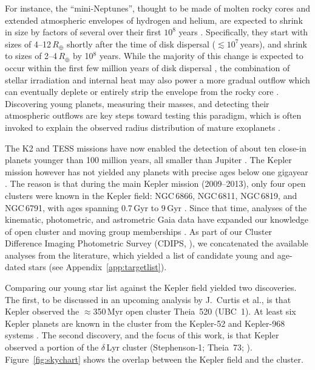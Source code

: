 \documentclass[12pt,modern,twocolumn,tighten]{aastex63}
\begin{document}
For instance, the ``mini-Neptunes'', thought to be made of molten
rocky cores \citep{kite_atmosphere_2020} and extended atmospheric
envelopes of hydrogen and helium, are expected to shrink in size by
factors of several over their first $10^8$ years
\citep{owen_atmospheres_2016,owen_constraining_2020}.  Specifically,
they start with sizes of 4--12\,$R_\oplus$ shortly after the time of disk
dispersal ($\lesssim$$10^7$\,years), and shrink to sizes of
2--4\,$R_\oplus$ by 10$^8$ years.  While the majority of this change
is expected to occur within the first few million years of disk
dispersal \citep{owen_atmospheres_2016}, the combination of stellar
irradiation and internal heat may also power a more
gradual outflow which can eventually deplete or entirely strip the
envelope from the rocky core
\citep{Owen_Wu_2013,ginzburg_corepowered_2018}.  Discovering young
planets, measuring their masses, and detecting their atmospheric
outflows are key steps toward testing this paradigm, which is often
invoked to explain the observed radius distribution of mature
exoplanets \citep{Fulton_et_al_2017}.

The K2 and TESS missions have now enabled the detection of about ten
close-in planets younger than 100 million years, all smaller than
Jupiter
\citep{Mann_K2_33b_2016,David_et_al_2017,david_four_2019,newton_tess_2019,bouma_cluster_2020,plavchan_planet_2020,rizzuto_tess_2020}.
The Kepler mission however has not yielded any planets with precise
ages below one gigayear \citep{Meibom_et_al_2013}.  The reason is that
during the main Kepler mission (2009--2013), only four open
clusters were known in the Kepler field: NGC\,6866, NGC\,6811,
NGC\,6819, and NGC\,6791, with ages spanning 0.7\,Gyr to 9\,Gyr
\citep{meibom_kepler_2011}.  Since that time, analyses of the
kinematic, photometric, and astrometric Gaia data have expanded our
knowledge of open cluster and moving group memberships \citep[{\it
e.g.},][]{cantatgaudin_gaia_2018,zari_3d_2018,kounkel_untangling_2019,Meingast2021,Kerr2021}.
As part of our Cluster Difference Imaging Photometric Survey (CDIPS,
\citealt{bouma_cdipsI_2019}), we concatenated the available analyses
from the literature, which yielded a list of candidate young and
age-dated stars (see Appendix~\ref{app:targetlist}).

Comparing our young star list against the Kepler field yielded two
discoveries.  The first, to be discussed in an upcoming analysis by
J.~Curtis et al{.}, is that Kepler observed the $\approx$350\,Myr open
cluster Theia~520 (UBC~1).  At least six Kepler planets are known in
the cluster from the Kepler-52 and Kepler-968 systems
\citep{rowe_validation_2014,jontof-hutter_following_2021}.  The second
discovery, and the focus of this work, is that Kepler observed a
portion of the $\delta$\,Lyr cluster (Stephenson-1; Theia~73;
\citealt{stephenson_possible_1959}).  Figure~\ref{fig:skychart} shows
the overlap between the Kepler field and the cluster.
\end{document}
